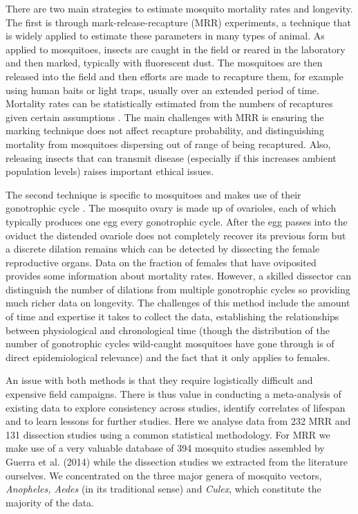 \documentclass[]{article}
\begin{document}
There are two main strategies to estimate mosquito mortality rates and
longevity. The first is through mark-release-recapture (MRR)
experiments, a technique that is widely applied to estimate these
parameters in many types of animal. As applied to mosquitoes, insects
are caught in the field or reared in the laboratory and then marked,
typically with fluorescent dust. The mosquitoes are then released into
the field and then efforts are made to recapture them, for example using
human baits or light traps, usually over an extended period of time.
Mortality rates can be statistically estimated from the numbers of
recaptures given certain assumptions \citep{silver2007mosquito}. The main challenges with MRR is
ensuring the marking technique does not affect recapture probability,
and distinguishing mortality from mosquitoes dispersing out of range of
being recaptured. Also, releasing insects that can transmit disease
(especially if this increases ambient population levels) raises
important ethical issues.

The second technique is specific to mosquitoes and makes use of their
gonotrophic cycle \citep{polovodova1949determination,detinova1962age}. The mosquito ovary is made up of ovarioles, each of
which typically produces one egg every gonotrophic cycle. After the egg
passes into the oviduct the distended ovariole does not completely
recover its previous form but a discrete dilation remains which can be
detected by dissecting the female reproductive organs. Data on the
fraction of females that have oviposited provides some information about
mortality rates. However, a skilled dissector can distinguish the number
of dilations from multiple gonotrophic cycles so providing much richer
data on longevity. The challenges of this method include the amount of
time and expertise it takes to collect the data, establishing the
relationships between physiological and chronological time (though the
distribution of the number of gonotrophic cycles wild-caught mosquitoes
have gone through is of direct epidemiological relevance) and the fact
that it only applies to females.

An issue with both methods is that they require logistically difficult
and expensive field campaigns. There is thus value in conducting a
meta-analysis of existing data to explore consistency across studies,
identify correlates of lifespan and to learn lessons for further
studies. Here we analyse data from 232 MRR and 131 dissection studies
using a common statistical methodology. For MRR we make use of a very
valuable database of 394 mosquito studies assembled by Guerra et al.
(2014) while the dissection studies we extracted from the literature
ourselves. We concentrated on the three major genera of mosquito
vectors, \emph{Anopheles, Aedes} (in its traditional sense) and
\emph{Culex}, which constitute the majority of the data.
\end{document}
